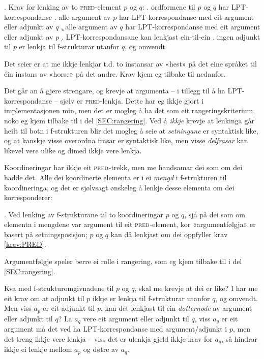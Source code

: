 \documentclass[12pt,a4paper,oneside,draft]{report}
\newcommand{\F}[2]{\textsc{#1}\ensuremath{_{#2}}}
\newcommand{\PRED}{\F{pred}{}}
\begin{document}
\ex. \label{krav:PRED} Krav for lenking av to \PRED{}-element $p$ og $q$:
\a. ordformene til $p$ og $q$ har LPT\hyp{}korrespondanse
\b. alle argument av $p$ har LPT\hyp{}korrespondanse med eit argument eller adjunkt av $q$
\c. alle argument av $q$ har LPT\hyp{}korrespondanse med eit argument eller adjunkt av $p$
\d. LPT\hyp{}korrespondansane kan lenkjast ein-til-ein
\e. ingen adjunkt til $p$ er lenkja til f\hyp{}strukturar utanfor $q$, og omvendt

Det \Last[d] seier er at me ikkje lenkjar t.d. to instansar av «hest»
på det eine språket til éin instans av «horse» på det andre. Krav
\Last[e] kjem eg tilbake til nedanfor. 

Det går an å gjere \Last strengare, og krevje at argumenta -- i
tillegg til å ha LPT\hyp{}korrespondanse -- sjølv er \PRED{}-lenkja. Dette har
eg ikkje gjort i implementasjonen min, men det er mogleg å ha det som
eit rangeringskriterium, noko eg kjem tilbake til i del
\ref{SEC:rangering}. Ved å \emph{ikkje} krevje at lenkinga går heilt til
botn i f\hyp{}strukturen blir det mogleg å seie at \emph{setningane} er
syntaktisk like, og at kanskje visse overordna frasar er syntaktisk
like, men visse \emph{delfrasar} kan likevel vere ulike og dimed ikkje vere
lenkja.

 Koordineringar har ikkje eit \PRED{}-trekk, men me handsamar dei som
 om dei hadde det. Alle dei koordinerte elementa er i ei \emph{mengd} i
 f\hyp{}strukturen til koordineringa, og det er sjølvsagt ønskeleg å lenkje
 desse elementa om dei korresponderer:

 \ex. \label{krav:COORD} Ved lenking av f\hyp{}strukturane til to
 koordineringar $p$ og $q$, sjå på dei som om elementa i mengdene var
 argument til eit \PRED{}-element, kor «argumentfølgja» er basert på
 setningsposisjon; $p$ og $q$ kan då lenkjast om dei oppfyller krav
 \ref{krav:PRED}.

 Argumentfølgje speler berre ei rolle i rangering, som eg kjem tilbake
 til i del \ref{SEC:rangering}.

Kva med f\hyp{}strukturomgivnadene til $p$ og $q$, skal me krevje at dei er
like?  I \Last[e] har me eit krav om at adjunkt til $p$ ikkje er
lenkja til f\hyp{}strukturar utanfor $q$, og omvendt. Men viss $a_p$ er eit
adjunkt til $p$, kan det lenkjast til ein \emph{dotternode} av argument
eller adjunkt til $q$? La $a_q$ vere eit argument eller adjunkt til
$q$, viss $a_q$ er eit argument må det ved \Last ha LPT\hyp{}korrespondanse
med argument/adjunkt i $p$, men det treng ikkje vere lenkja -- viss
det er ulenkja gjeld ikkje krav \Last for $a_q$, så \Last hindrar
ikkje ei lenkje mellom $a_p$ og døtre av $a_q$. 
\end{document}
